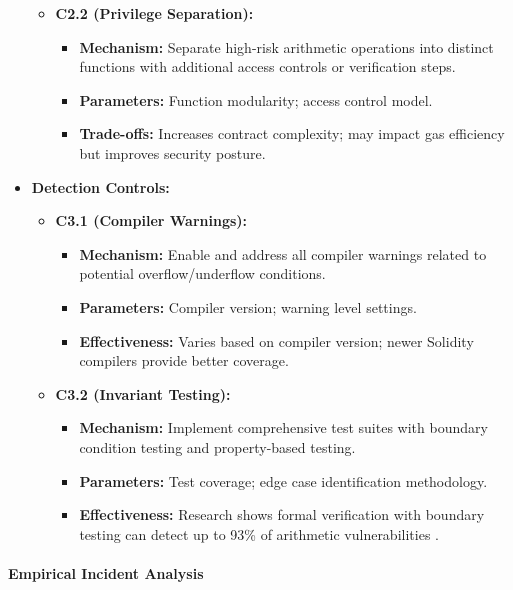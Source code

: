 \begin{itemize}
\begin{itemize}
    \item \textbf{C2.2 (Privilege Separation):}
        \begin{itemize}
        \item \textbf{Mechanism:} Separate high-risk arithmetic operations into distinct functions with additional access controls or verification steps.
        \item \textbf{Parameters:} Function modularity; access control model.
        \item \textbf{Trade-offs:} Increases contract complexity; may impact gas efficiency but improves security posture.
        \end{itemize}
    \end{itemize}

\item \textbf{Detection Controls:}
    \begin{itemize}
    \item \textbf{C3.1 (Compiler Warnings):}
        \begin{itemize}
        \item \textbf{Mechanism:} Enable and address all compiler warnings related to potential overflow/underflow conditions.
        \item \textbf{Parameters:} Compiler version; warning level settings.
        \item \textbf{Effectiveness:} Varies based on compiler version; newer Solidity compilers provide better coverage.
        \end{itemize}
    
    \item \textbf{C3.2 (Invariant Testing):}
        \begin{itemize}
        \item \textbf{Mechanism:} Implement comprehensive test suites with boundary condition testing and property-based testing.
        \item \textbf{Parameters:} Test coverage; edge case identification methodology.
        \item \textbf{Effectiveness:} Research shows formal verification with boundary testing can detect up to 93\% of arithmetic vulnerabilities \cite{praitheeshan2019systematic}.
        \end{itemize}
    \end{itemize}
\end{itemize}

\paragraph{Empirical Incident Analysis}

